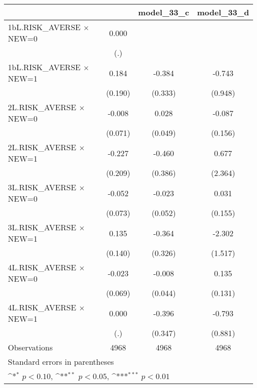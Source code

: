 {
\def\sym#1{\ifmmode^{#1}\else\(^{#1}\)\fi}
\begin{longtable}{l*{3}{c}}
\toprule\endfirsthead\midrule\endhead\midrule\endfoot\endlastfoot
                &\multicolumn{1}{c}{}&\multicolumn{1}{c}{model\_33\_c}&\multicolumn{1}{c}{model\_33\_d}\\
\midrule
1bL.RISK\_AVERSE $\times$ NEW=0&    0.000         &                  &                  \\
                &      (.)         &                  &                  \\
\addlinespace
1bL.RISK\_AVERSE $\times$ NEW=1&    0.184         &   -0.384         &   -0.743         \\
                &  (0.190)         &  (0.333)         &  (0.948)         \\
\addlinespace
2L.RISK\_AVERSE $\times$ NEW=0&   -0.008         &    0.028         &   -0.087         \\
                &  (0.071)         &  (0.049)         &  (0.156)         \\
\addlinespace
2L.RISK\_AVERSE $\times$ NEW=1&   -0.227         &   -0.460         &    0.677         \\
                &  (0.209)         &  (0.386)         &  (2.364)         \\
\addlinespace
3L.RISK\_AVERSE $\times$ NEW=0&   -0.052         &   -0.023         &    0.031         \\
                &  (0.073)         &  (0.052)         &  (0.155)         \\
\addlinespace
3L.RISK\_AVERSE $\times$ NEW=1&    0.135         &   -0.364         &   -2.302         \\
                &  (0.140)         &  (0.326)         &  (1.517)         \\
\addlinespace
4L.RISK\_AVERSE $\times$ NEW=0&   -0.023         &   -0.008         &    0.135         \\
                &  (0.069)         &  (0.044)         &  (0.131)         \\
\addlinespace
4L.RISK\_AVERSE $\times$ NEW=1&    0.000         &   -0.396         &   -0.793         \\
                &      (.)         &  (0.347)         &  (0.881)         \\
\midrule
Observations    &     4968         &     4968         &     4968         \\
\bottomrule
\multicolumn{4}{l}{\footnotesize Standard errors in parentheses}\\
\multicolumn{4}{l}{\footnotesize \sym{*} \(p<0.10\), \sym{**} \(p<0.05\), \sym{***} \(p<0.01\)}\\
\end{longtable}
}
